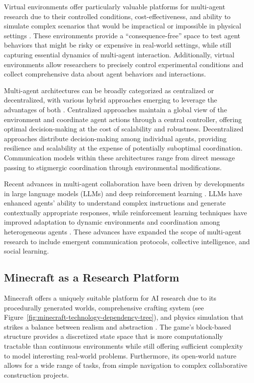 \documentclass[a4paper, 12pt]{article}
\begin{document}
Virtual environments offer particularly valuable platforms for multi-agent research due to their controlled conditions, cost-effectiveness, and ability to simulate complex scenarios that would be impractical or impossible in physical settings \autocite{Shu2024, Lhaksmana2018}. These environments provide a ``consequence-free'' space to test agent behaviors that might be risky or expensive in real-world settings, while still capturing essential dynamics of multi-agent interaction. Additionally, virtual environments allow researchers to precisely control experimental conditions and collect comprehensive data about agent behaviors and interactions.

Multi-agent architectures can be broadly categorized as centralized or decentralized, with various hybrid approaches emerging to leverage the advantages of both \autocite{Leeuwen2021}. Centralized approaches maintain a global view of the environment and coordinate agent actions through a central controller, offering optimal decision-making at the cost of scalability and robustness. Decentralized approaches distribute decision-making among individual agents, providing resilience and scalability at the expense of potentially suboptimal coordination. Communication models within these architectures range from direct message passing to stigmergic coordination through environmental modifications.

Recent advances in multi-agent collaboration have been driven by developments in large language models (LLMs) and deep reinforcement learning \autocite{Shu2024, Qiu2024}. LLMs have enhanced agents' ability to understand complex instructions and generate contextually appropriate responses, while reinforcement learning techniques have improved adaptation to dynamic environments and coordination among heterogeneous agents \autocite{Chen2024}. These advances have expanded the scope of multi-agent research to include emergent communication protocols, collective intelligence, and social learning.

\subsection{Minecraft as a Research Platform}

Minecraft offers a uniquely suitable platform for AI research due to its procedurally generated worlds, comprehensive crafting system (see Figure~\ref{fig:minecraft-technology-dependency-tree}), and physics simulation that strikes a balance between realism and abstraction \autocite{Fan2022}. The game's block-based structure provides a discretized state space that is more computationally tractable than continuous environments while still offering sufficient complexity to model interesting real-world problems. Furthermore, its open-world nature allows for a wide range of tasks, from simple navigation to complex collaborative construction projects.
\end{document}
